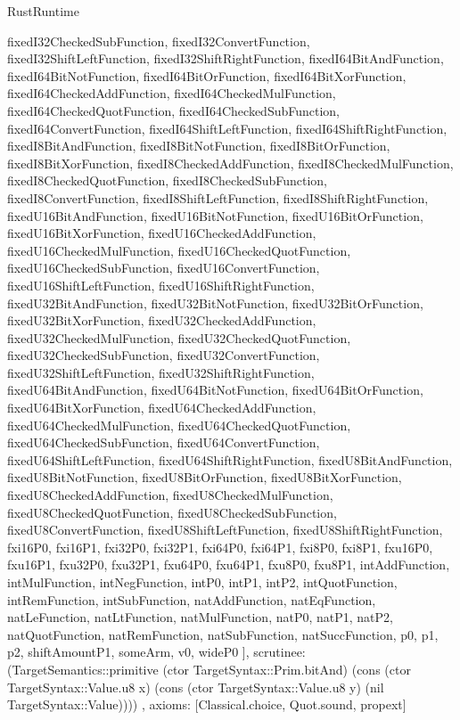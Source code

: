 \begin{lexlean}{RustRuntime}
\begin{semanticmodule}
{{      fixedI32CheckedSubFunction,
      fixedI32ConvertFunction,
      fixedI32ShiftLeftFunction,
      fixedI32ShiftRightFunction,
      fixedI64BitAndFunction,
      fixedI64BitNotFunction,
      fixedI64BitOrFunction,
      fixedI64BitXorFunction,
      fixedI64CheckedAddFunction,
      fixedI64CheckedMulFunction,
      fixedI64CheckedQuotFunction,
      fixedI64CheckedSubFunction,
      fixedI64ConvertFunction,
      fixedI64ShiftLeftFunction,
      fixedI64ShiftRightFunction,
      fixedI8BitAndFunction,
      fixedI8BitNotFunction,
      fixedI8BitOrFunction,
      fixedI8BitXorFunction,
      fixedI8CheckedAddFunction,
      fixedI8CheckedMulFunction,
      fixedI8CheckedQuotFunction,
      fixedI8CheckedSubFunction,
      fixedI8ConvertFunction,
      fixedI8ShiftLeftFunction,
      fixedI8ShiftRightFunction,
      fixedU16BitAndFunction,
      fixedU16BitNotFunction,
      fixedU16BitOrFunction,
      fixedU16BitXorFunction,
      fixedU16CheckedAddFunction,
      fixedU16CheckedMulFunction,
      fixedU16CheckedQuotFunction,
      fixedU16CheckedSubFunction,
      fixedU16ConvertFunction,
      fixedU16ShiftLeftFunction,
      fixedU16ShiftRightFunction,
      fixedU32BitAndFunction,
      fixedU32BitNotFunction,
      fixedU32BitOrFunction,
      fixedU32BitXorFunction,
      fixedU32CheckedAddFunction,
      fixedU32CheckedMulFunction,
      fixedU32CheckedQuotFunction,
      fixedU32CheckedSubFunction,
      fixedU32ConvertFunction,
      fixedU32ShiftLeftFunction,
      fixedU32ShiftRightFunction,
      fixedU64BitAndFunction,
      fixedU64BitNotFunction,
      fixedU64BitOrFunction,
      fixedU64BitXorFunction,
      fixedU64CheckedAddFunction,
      fixedU64CheckedMulFunction,
      fixedU64CheckedQuotFunction,
      fixedU64CheckedSubFunction,
      fixedU64ConvertFunction,
      fixedU64ShiftLeftFunction,
      fixedU64ShiftRightFunction,
      fixedU8BitAndFunction,
      fixedU8BitNotFunction,
      fixedU8BitOrFunction,
      fixedU8BitXorFunction,
      fixedU8CheckedAddFunction,
      fixedU8CheckedMulFunction,
      fixedU8CheckedQuotFunction,
      fixedU8CheckedSubFunction,
      fixedU8ConvertFunction,
      fixedU8ShiftLeftFunction,
      fixedU8ShiftRightFunction,
      fxi16P0,
      fxi16P1,
      fxi32P0,
      fxi32P1,
      fxi64P0,
      fxi64P1,
      fxi8P0,
      fxi8P1,
      fxu16P0,
      fxu16P1,
      fxu32P0,
      fxu32P1,
      fxu64P0,
      fxu64P1,
      fxu8P0,
      fxu8P1,
      intAddFunction,
      intMulFunction,
      intNegFunction,
      intP0,
      intP1,
      intP2,
      intQuotFunction,
      intRemFunction,
      intSubFunction,
      natAddFunction,
      natEqFunction,
      natLeFunction,
      natLtFunction,
      natMulFunction,
      natP0,
      natP1,
      natP2,
      natQuotFunction,
      natRemFunction,
      natSubFunction,
      natSuccFunction,
      p0,
      p1,
      p2,
      shiftAmountP1,
      someArm,
      v0,
      wideP0
    ],
    scrutinee: (TargetSemantics::primitive (ctor TargetSyntax::Prim.bitAnd) (cons (ctor TargetSyntax::Value.u8 x) (cons (ctor TargetSyntax::Value.u8 y) (nil TargetSyntax::Value))))
  },
  axioms: [Classical.choice, Quot.sound, propext]
}


\end{semanticmodule}
\end{lexlean}
